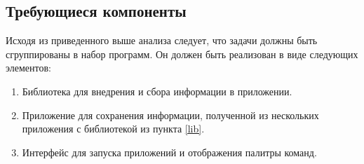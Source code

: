 \subsection{Требующиеся компоненты}

Исходя из приведенного выше анализа следует, что задачи должны быть сгруппированы
в набор программ. Он должен быть реализован в виде следующих элементов:

\begin{enumerate}
	\item\label{lib} Библиотека для внедрения и сбора информации в приложении.
	\item Приложение для сохранения информации, полученной из нескольких
	приложения с библиотекой из пункта \ref{lib}.
	\item Интерфейс для запуска приложений и отображения палитры команд.
\end{enumerate}


